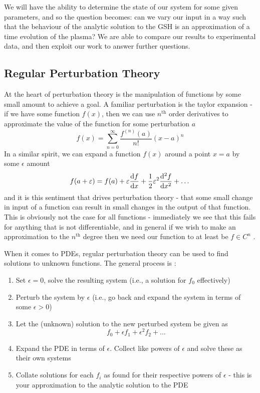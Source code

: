 We will have the ability to determine the 
state of our system for some given parameters, and so the question becomes: can 
we vary our input in a way such that the behaviour of the analytic solution to 
the GSH is an approximation of a time evolution of the plasma? We are able to compare 
our results to experimental data, and then exploit our work to answer further questions.



\subsection{Regular Perturbation Theory}

At the heart of perturbation theory is the manipulation of functions by some small amount to achieve a goal. A familiar 
perturbation is the taylor expansion - if we have some function $f(x)$, then we can use $n^{\text{th}}$ order derivatives to approximate 
the value of the function for some perturbation $a$
\begin{equation*}
    f(x) = \sum_{n = 0}^{\infty} \frac{f^{(n)}(a)}{n!} (x - a)^n
\end{equation*}
In a similar spirit, we can expand a function $f(x)$ around a point $x = a$ by some $\epsilon$ amount
$$f(a + \varepsilon) = f(a) + \varepsilon \dv{f}{x}(a) + \frac{1}{2} \varepsilon^2 \dv[2]{f}{x}(a) + \dots$$
and it is this sentiment that drives perturbation theory - that some small change in input of a function can result 
in small changes in the output of that function. This is obviously not the case for all functions - immediately we see that this 
fails for anything that is not differentiable, and in general if we wish to make an approximation to the $n^{\text{th}}$ degree then 
we need our function to at least be $f \in C^n$ \cite{perturbation-basics}. 

When it comes to PDEs, regular perturbation theory can be used to find solutions to unknown functions. The general process is \cite{perturbation-basics}:
\begin{enumerate}
    \item Set $\epsilon = 0$, solve the resulting system (i.e., a solution for $f_0$ effectively)
    \item Perturb the system by $\epsilon$ (i.e., go back and expand the system in terms of some $\epsilon > 0$)
    \item Let the (unknown) solution to the new perturbed system be given as
    $$f_0 + \epsilon f_1 + \epsilon^2 f_2 + \dots$$
    \item Expand the PDE in terms of $\epsilon$. Collect like powers of $\epsilon$ and solve these as their own systems
    \item Collate solutions for each $f_i$ as found for their respective powers of $\epsilon$ - this is your approximation 
    to the analytic solution to the PDE
\end{enumerate}

